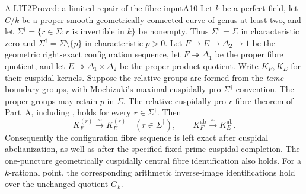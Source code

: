 \begin{claim}{A.LIT2}{Proved: a limited repair of the fibre input}{A10}
Let $k$ be a perfect field, let $C/k$ be a proper smooth
geometrically connected curve of genus at least two, and let
$\Sigma^\dagger=\{r\in\Sigma:r\text{ is invertible in }k\}$
be nonempty. Thus $\Sigma^\dagger=\Sigma$ in characteristic
zero and $\Sigma^\dagger=\Sigma\setminus\{p\}$ in
characteristic $p>0$.
Let $F\to E\to\Delta_2\to1$ be the geometric right-exact configuration
sequence, let $F\twoheadrightarrow\Delta_1$ be the proper fibre quotient,
and let $E\twoheadrightarrow\Delta_1\times\Delta_2$ be the proper product
quotient. Write $K_F,K_E$ for their cuspidal kernels. Suppose the relative
groups are formed from the \emph{tame} boundary groups, with Mochizuki's
maximal cuspidally pro-$\Sigma^\dagger$ convention. The proper groups
may retain $p$ in $\Sigma$. The relative cuspidally pro-$r$ fibre
theorem of Part~A, including , holds for every
$r\in\Sigma^\dagger$.
Then
\[
 K_F^{(r)}\xrightarrow{\sim}K_E^{(r)}\quad(r\in\Sigma^\dagger),
 \qquad K_F^{\mathrm{ab}}\xrightarrow{\sim}K_E^{\mathrm{ab}}.
\]
Consequently the configuration fibre sequence is left exact after
cuspidal abelianization, as well as after the specified fixed-prime
cuspidal completion. The one-puncture geometrically cuspidally central
fibre identification also holds. For a $k$-rational point, the
corresponding arithmetic inverse-image identifications hold over
the unchanged quotient $G_k$.
\end{claim}
